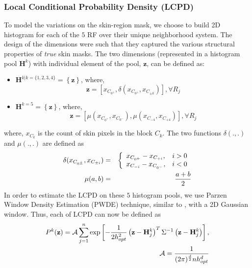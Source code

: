 \documentclass[times, 10pt,twocolumn]{article}
\begin{document}
\subsubsection{Local Conditional Probability Density (LCPD)}\label{LCPD} To model the
variations on the skin-region mask, we choose to build 2D histogram
for each of the $5$ RF over their unique neighborhood system. The
design of the dimensions were such that they captured the various
structural properties of {\it true} skin masks. The two dimensions
(represented in a histogram pool ${\mathbf H}^k$) with individual
element of the pool, ${\mathbf z}$, can be defined as:
\begin{itemize}
\item $\mathbf{H}^{k|k=\{1,2,3,4\}} = \left\{ \mathbf{z}\right\}$, where,
\begin{equation}\mathbf{z} = [x_{C_{0^{\pm}}}, \delta(x_{C_{0^{\pm}}},
x_{C_{\pm k}})] , \forall R_{j} \label{Eqn:9}
\end{equation}

\item$\mathbf{H}^{k=5} = \left\{
\mathbf{z}\right\}$, where,
\begin{equation}
\mathbf{z} = [\mu(x_{C_{0^+}},x_{C_{0^-}}), \mu(x_{C_{-4}},
x_{C_{+4}})] , \forall R_{j} \label{Eqn:10}
\end{equation}
\end{itemize}

where, $x_{C_k}$ is the count of skin pixels in the block $C_k$. The
two functions $\delta(.,.)$ and $\mu(.,.)$ are defined as
\begin{eqnarray}
\delta(x_{C_{0^{\pm}}}, x_{C_{\pm i}}) & = & \left\{
\begin{array}{l l}
x_{C_{0^+}} - x_{C_{+i}}, & i>0 \\
x_{C_{-i}} - x_{C_{0^-}}, & i<0 \\
\end{array}
\right. \\
\mu(a,b) & = & \frac{a+b}{2}
\end{eqnarray}
In order to estimate the LCPD on these $5$ histogram pools, we use
Parzen Window Density Estimation (PWDE) technique, similar to
\cite{paget_texture_1997}, with a 2D Gaussian window. Thus, each of
LCPD can now be defined as
\begin{eqnarray}
 P^k(\mathbf z) = {\mathcal A} \sum\limits_{j=1}^n \exp
\left[-\frac{1}{2 h^2_{opt}} \left(\mathbf{z} - \mathbf
{H}^k_j\right)^T \Sigma^{-1} \left( \mathbf{z} - \mathbf
{H}^k_j\right) \right],   \\ \hspace{-1in}{\mathcal A} =
\frac{1}{(2\pi)^{\frac{d}{2}} n h_{opt}^d} \nonumber
\end{eqnarray}
\end{document}
